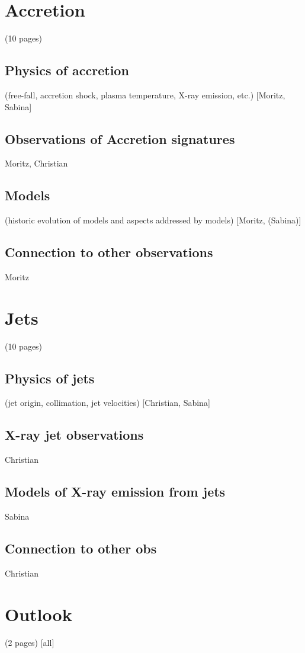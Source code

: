 \documentclass[graybox, nosecnum]{svmult}
\begin{document}
\section{Accretion}
(10 pages)
\subsection{Physics of accretion}
(free-fall, accretion shock, plasma temperature, X-ray emission, etc.) [Moritz, Sabina]
\subsection{Observations of Accretion signatures}
           Moritz, Christian
\subsection{Models}
           (historic evolution of models and aspects addressed by models) [Moritz, (Sabina)]
\subsection{Connection to other observations}
           Moritz

\section{Jets}
         (10 pages)
\subsection{Physics of jets}
(jet origin, collimation, jet velocities) [Christian, Sabina]

\subsection{X-ray jet observations}
           Christian
\subsection{Models of X-ray emission from jets}
                      Sabina
\subsection{Connection to other obs}
                                Christian

\section{Outlook}
(2 pages) [all]
\end{document}
